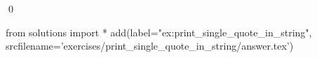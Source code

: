 
\begin{ex} 
  \label{ex:print_single_quote_in_string}
  
  \qed
\end{ex} 
\begin{python0}
from solutions import *
add(label="ex:print_single_quote_in_string",
    srcfilename='exercises/print_single_quote_in_string/answer.tex') 
\end{python0}
